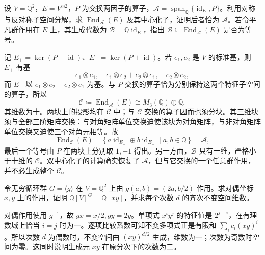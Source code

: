 \begin{exercise}\label{b2:ex:08-commuting-not-centralizers}
	设 \(V=\mathbb Q^2\)，\(E=V^{\otimes2}\)，\(P\) 为交换两因子的算子，\(\mathcal A=\operatorname{span}_{\mathbb Q}\{\operatorname{id}_E,P\}\)。利用对称与反对称子空间分解，求 \(\operatorname{End}_{\mathcal A}(E)\) 及其中心化子，证明后者恰为 \(\mathcal A\)。若令平凡群作用在 \(E\) 上，其生成代数为 \(\mathcal B=\mathbb Q\operatorname{id}_E\)，指出 \(\mathcal B\subseteq\operatorname{End}_{\mathcal A}(E)\) 是否为等号。
\end{exercise}
\begin{solution}
	记 \(E_+=\ker(P-\operatorname{id})\)、\(E_-=\ker(P+\operatorname{id})\)。若 \(e_1,e_2\) 是 \(V\) 的标准基，则 \(E_+\) 有基
	\[
		e_1\otimes e_1,\quad e_1\otimes e_2+e_2\otimes e_1,\quad e_2\otimes e_2,
	\]
	而 \(E_-\) 以 \(e_1\otimes e_2-e_2\otimes e_1\) 为基。与 \(P\) 交换的算子恰为分别保持这两个特征子空间的算子，所以
	\[
		\mathcal C\coloneqq\operatorname{End}_{\mathcal A}(E) \cong M_3(\mathbb Q)\oplus\mathbb Q,
	\]
	其维数为十。两块上的投影均在 \(\mathcal C\) 中；与 \(\mathcal C\) 交换的算子因而也须分块。其三维块须与全部三阶矩阵交换：与对角矩阵单位交换迫使该块为对角矩阵，与非对角矩阵单位交换又迫使三个对角元相等。故
	\[
		\operatorname{End}_{\mathcal C}(E) =\{\,a\operatorname{id}_{E_+}\oplus b\operatorname{id}_{E_-}\mid a,b\in\mathbb Q\,\} =\mathcal A,
	\]
	最后一个等号由 \(P\) 在两块上分别取 \(1,-1\) 得出。另一方面，\(\mathcal B\) 只有一维，严格小于十维的 \(\mathcal C\)。双中心化子的计算确实恢复了 \(\mathcal A\)，但与它交换的一个任意群作用，并不必生成整个 \(\mathcal C\)。
\end{solution}

\begin{exercise}\label{b2:ex:08-polynomial-weight-invariants}
	令无穷循环群 \(G=\langle g\rangle\) 在 \(V=\mathbb Q^2\) 上由 \(g(a,b)=(2a,b/2)\) 作用。求对偶坐标 \(x,y\) 上的作用，证明 \(\mathbb Q[V]^G=\mathbb Q[xy]\)，并求每个次数 \(d\) 的齐次不变空间维数。
\end{exercise}
\begin{solution}
	对偶作用使用 \(g^{-1}\)，故 \(gx=x/2,gy=2y\)。单项式 \(x^iy^j\) 的特征值是 \(2^{j-i}\)，在有理数域上恰当 \(i=j\) 时为一。逐项比较系数可知不变多项式正是有限和 \(\sum_i c_i(xy)^i\)。所以次数 \(d\) 为偶数时，不变空间由 \((xy)^{d/2}\) 生成，维数为一；次数为奇数时空间为零。这同时说明生成元 \(xy\) 在原分次下的次数为二。
\end{solution}

